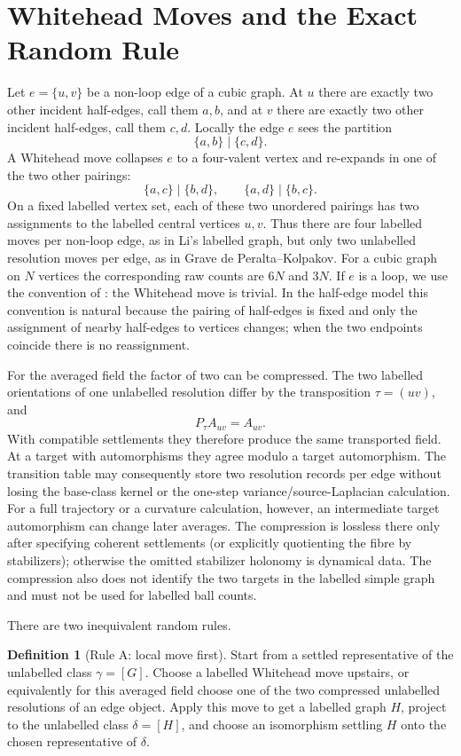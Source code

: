\documentclass[11pt]{article}
\theoremstyle{definition}
\newtheorem{definition}[theorem]{Definition}
\begin{document}
\section{Whitehead Moves and the Exact Random Rule}

Let $e=\{u,v\}$ be a non-loop edge of a cubic graph.  At $u$ there are exactly
two other incident half-edges, call them $a,b$, and at $v$ there are exactly two
other incident half-edges, call them $c,d$.  Locally the edge $e$ sees the
partition
\[
    \{a,b\}\mid\{c,d\}.
\]
A Whitehead move collapses $e$ to a four-valent vertex and re-expands in one of
the two other pairings:
\[
    \{a,c\}\mid\{b,d\},
    \qquad
    \{a,d\}\mid\{b,c\}.
\]
On a fixed labelled vertex set, each of these two unordered pairings has two
assignments to the labelled central vertices $u,v$.  Thus there are four
labelled moves per non-loop edge, as in Li's labelled graph, but only two
unlabelled resolution moves per edge, as in Grave de Peralta--Kolpakov.  For a
cubic graph on $N$ vertices the corresponding raw counts are $6N$ and $3N$.
If $e$ is a loop, we use the convention of \cite{gdp-kolpakov}: the Whitehead
move is trivial.  In the half-edge model this convention is natural because the
pairing of half-edges is fixed and only the assignment of nearby half-edges to
vertices changes; when the two endpoints coincide there is no reassignment.

For the averaged field the factor of two can be compressed.  The two labelled
orientations of one unlabelled resolution differ by the transposition
$\tau=(uv)$, and
\[
    P_\tau A_{uv}=A_{uv}.
\]
With compatible settlements they therefore produce the same transported
field.  At a target with automorphisms they agree modulo a target
automorphism.  The transition table may consequently store two resolution
records per edge without losing the base-class kernel or the one-step
variance/source-Laplacian calculation.  For a full trajectory or a curvature
calculation, however, an intermediate target automorphism can change later
averages.  The compression is lossless there only after specifying coherent
settlements (or explicitly quotienting the fibre by stabilizers); otherwise
the omitted stabilizer holonomy is dynamical data.  The compression also does
not identify the two targets in the labelled simple graph and must not be used
for labelled ball counts.

There are two inequivalent random rules.

\begin{definition}[Rule A: local move first]
Start from a settled representative of the unlabelled class $\gamma=[G]$.
Choose a labelled Whitehead move upstairs, or equivalently for this averaged
field choose one of the two compressed unlabelled resolutions of an edge
object.  Apply this move to get a labelled graph $H$, project to the unlabelled
class $\delta=[H]$, and choose an isomorphism settling $H$ onto the chosen
representative of $\delta$.
\end{definition}
\end{document}
